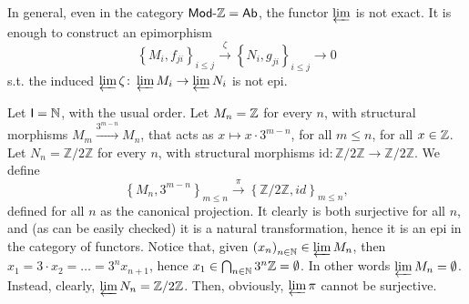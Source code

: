 \begin{ex}
	In general, even in the category $\mathsf{Mod}\text{-}\mathbb{Z} = \mathsf{Ab}$, the functor $\varprojlim$ is not exact.
	It is enough to construct an epimorphism
	\begin{equation}
		\left\{ M_i, f_{ji} \right\}_{i \leq j} \xrightarrow{\zeta} \left\{ N_i, g_{ji} \right\}_{i \leq j} \to 0 
	\end{equation} 
	s.t. the induced $\varprojlim \zeta\colon \varprojlim M_i \to \varprojlim N_i$  is not epi.

	Let $\mathsf{I} = \mathbb{N}$, with the usual order.
	Let $M_n = \mathbb{Z}$ for every $n$, with structural morphisms $M_m \xrightarrow{3^{m-n}} M_n$, 
	that acts as $x \mapsto x \cdot 3^{m-n}$, for all $m \leq n$, for all $x \in \mathbb{Z}$.
	Let $N_n = \mathbb{Z}/2\mathbb{Z}$ for every $n$, with structural morphisms $\mathrm{id}: \mathbb{Z}/2\mathbb{Z} \to \mathbb{Z}/2\mathbb{Z}$.
	We define
	\begin{equation}
	\left\{ M_n, 3^{m-n} \right\}_{ m \leq n} \xrightarrow{\pi} \left\{ \mathbb{Z}/2\mathbb{Z}, id \right\}_{ m \leq n}
	,\end{equation} 
	defined for all $n$ as the canonical projection.
	It clearly is both surjective for all $n$, and (as can be easily checked) it is a natural transformation, hence it is an epi in the category of functors.
	Notice that, given $\left( x_n \right)_{n \in \mathbb{N}} \in \varprojlim M_n$, then $x_1 = 3 \cdot x_2 = \ldots = 3^n x_{n+1}$,
	hence $x_1 \in \bigcap_{n \in \mathbb{N}} 3^n \mathbb{Z} = \emptyset$.
	In other words $\varprojlim M_n = \emptyset$.
	Instead, clearly, $\varprojlim N_n = \mathbb{Z}/2\mathbb{Z}$.
	Then, obviously, $\varprojlim \pi$ cannot be surjective.
\end{ex} 
